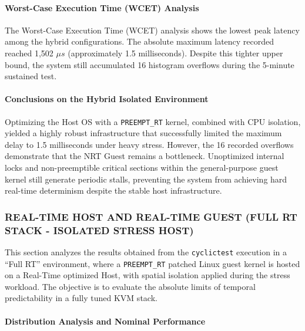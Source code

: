 \paragraph{Worst-Case Execution Time (WCET)
Analysis}\label{worst-case-execution-time-wcet-analysis-7}

The Worst-Case Execution Time (WCET) analysis shows the lowest peak
latency among the hybrid configurations. The absolute maximum latency
recorded reached 1,502 $\mu s$ (approximately 1.5 milliseconds). Despite this
tighter upper bound, the system still accumulated 16 histogram overflows
during the 5-minute sustained test.

\paragraph{Conclusions on the Hybrid Isolated
Environment}\label{conclusions-on-the-hybrid-isolated-environment-1}

Optimizing the Host OS with a \texttt{PREEMPT\_RT} kernel, combined with
CPU isolation, yielded a highly robust infrastructure that successfully
limited the maximum delay to 1.5 milliseconds under heavy stress.
However, the 16 recorded overflows demonstrate that the NRT Guest
remains a bottleneck. Unoptimized internal locks and non-preemptible
critical sections within the general-purpose guest kernel still generate
periodic stalls, preventing the system from achieving hard real-time
determinism despite the stable host infrastructure.

\subsubsection{REAL-TIME HOST AND REAL-TIME GUEST (FULL RT STACK -
ISOLATED STRESS
HOST)}\label{real-time-host-and-real-time-guest-full-rt-stack---isolated-stress-host}

This section analyzes the results obtained from the \texttt{cyclictest}
execution in a ``Full RT'' environment, where a \texttt{PREEMPT\_RT}
patched Linux guest kernel is hosted on a Real-Time optimized Host, with
spatial isolation applied during the stress workload. The objective is
to evaluate the absolute limits of temporal predictability in a fully
tuned KVM stack.

\paragraph{Distribution Analysis and Nominal
Performance}\label{distribution-analysis-and-nominal-performance-4}

